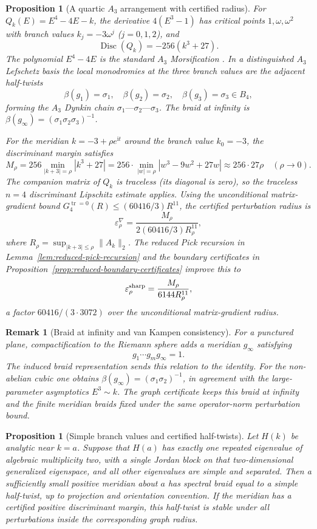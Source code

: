 \documentclass[11pt]{article}
\newtheorem{proposition}[theorem]{Proposition}
\newtheorem{remark}[theorem]{Remark}
\numberwithin{equation}{section}
\DeclareMathOperator{\Disc}{Disc}
\DeclareMathOperator{\tr}{tr}
\newcommand{\ii}{\mathrm i}
\begin{document}
\begin{proposition}[A quartic $A_3$ arrangement with certified radius]
\label{prop:A3-quartic}
For $Q_k(E)=E^4-4E-k$, the derivative $4(E^3-1)$ has critical points
$1,\omega,\omega^2$ with branch values $k_j=-3\omega^j$ ($j=0,1,2$), and
\[
  \Disc(Q_k)=-256(k^3+27).
\]
The polynomial $E^4-4E$ is the standard $A_3$ Morsification
\cite{BrieskornKnoerrer1986}.  In a distinguished $A_3$ Lefschetz basis
the local monodromies at the three branch values are the adjacent half-twists
\[
  \beta(g_1)=\sigma_1,\quad\beta(g_2)=\sigma_2,\quad\beta(g_3)=\sigma_3\in B_4,
\]
forming the $A_3$ Dynkin chain $\sigma_1\text{---}\sigma_2\text{---}\sigma_3$.
The braid at infinity is $\beta(g_\infty)=(\sigma_1\sigma_2\sigma_3)^{-1}$.

For the meridian $k=-3+\rho e^{\ii t}$ around the branch value $k_0=-3$,
the discriminant margin satisfies
\[
  M_\rho=256\min_{|k+3|=\rho}|k^3+27|=256\cdot\min_{|w|=\rho}|w^3-9w^2+27w|
  \approx256\cdot27\rho\quad(\rho\to0).
\]
The companion matrix of $Q_k$ is traceless (its diagonal is zero), so the
traceless $n=4$ discriminant Lipschitz estimate applies.  Using the
unconditional matrix-gradient bound
\(G_4^{\tr=0}(R)\le(60416/3)R^{11}\), the certified perturbation radius is
\[
  \varepsilon_\rho^{\nabla}
  =\frac{M_\rho}{2(60416/3)R_\rho^{11}},
\]
where $R_\rho=\sup_{|k+3|\le\rho}\|A_k\|_2$.
The reduced Pick recursion in Lemma~\ref{lem:reduced-pick-recursion} and the
boundary certificates in Proposition~\ref{prop:reduced-boundary-certificates}
improve this to
\[
  \varepsilon_\rho^{\rm sharp}
  =\frac{M_\rho}{6144R_\rho^{11}},
\]
a factor \(60416/(3\cdot3072)\) over the unconditional matrix-gradient radius.
\end{proposition}

\begin{remark}[Braid at infinity and van Kampen consistency]
For a punctured plane, compactification to the Riemann sphere adds a
meridian \(g_\infty\) satisfying
\[
  g_1\cdots g_m g_\infty=1.
\]
The induced braid representation sends this relation to the identity.  For
the non-abelian cubic one obtains
\(\beta(g_\infty)=(\sigma_1\sigma_2)^{-1}\), in agreement with the
large-parameter asymptotics \(E^3\sim k\).  The graph certificate keeps this
braid at infinity and the finite meridian braids fixed under the same
operator-norm perturbation bound.
\end{remark}

\begin{proposition}[Simple branch values and certified half-twists]\label{prop:PL-half-twist}
Let \(H(k)\) be analytic near \(k=a\).  Suppose that \(H(a)\) has exactly
one repeated eigenvalue of algebraic multiplicity two, with a single Jordan
block on that two-dimensional generalized eigenspace, and all other
eigenvalues are simple and separated.  Then a sufficiently small positive
meridian about \(a\) has spectral braid equal to a simple half-twist, up to
projection and orientation convention.  If the meridian has a certified
positive discriminant margin, this half-twist is stable under all
perturbations inside the corresponding graph radius.
\end{proposition}
\end{document}
